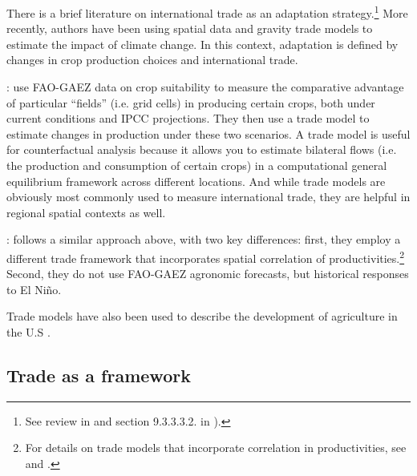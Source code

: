\documentclass[10 pt]{article}
\begin{document}
\begin{outline}

\item There is a brief literature on international trade as an adaptation strategy.\footnote{See review in \textcite{ZZH12} and section 9.3.3.3.2. in \textcite{IPCC5WG2}).}
More recently, authors have been using spatial data and gravity trade models to estimate the impact of climate change.
In this context, adaptation is defined by changes in crop production choices and international trade. 
\begin{blist}
	\item \textcite{CDS16}: use  FAO-GAEZ data on crop suitability to measure the comparative advantage of particular “fields” (i.e. grid cells) in producing certain crops, both under current conditions and IPCC projections. They then use a trade model to estimate changes in production under these two scenarios. A trade model is useful for counterfactual analysis because it allows you to estimate bilateral flows (i.e. the production and consumption of certain crops) in a computational general equilibrium framework across different locations. And while trade models are obviously most commonly used to measure international trade, they are helpful in regional spatial contexts as well.

	\item \textcite{DMH19-wp}: follows a similar approach above, with two key differences: first, they employ a different trade framework that incorporates spatial correlation of productivities.\footnote{
		For details on trade models that incorporate correlation in productivities, see \textcite{ACR12} and \textcite{LR18-wp}.
	} Second, they do not use FAO-GAEZ agronomic forecasts, but historical responses to El Ni\~{n}o. 
\end{blist}

\item Trade models have also been used to describe the development of agriculture in the U.S \parencite{DH16,CD16-wp}.

\end{outline}

\subsection{Trade as a framework}
\end{document}
